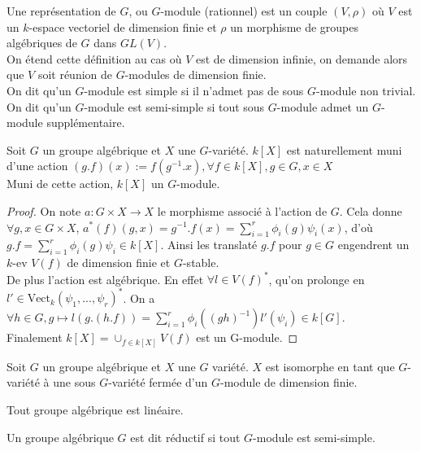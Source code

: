 \begin{defn}
Une représentation de $G$, ou $G$-module (rationnel) est un couple $(V, \rho)$ où $V$ est un $k$-espace vectoriel de dimension finie et $\rho$ un morphisme de groupes algébriques de $G$ dans $GL(V)$.\\
On étend cette définition au cas où $V$ est de dimension infinie, on demande alors que $V$ soit réunion de $G$-modules de dimension finie.\\
On dit qu'un $G$-module est simple si il n'admet pas de sous $G$-module non trivial. On dit qu'un $G$-module est semi-simple si tout sous $G$-module admet un $G$-module supplémentaire.
\end{defn}

\begin{prop}\label{GmoduleSectionsGlobales}
Soit $G$ un groupe algébrique et $X$ une $G$-variété. $k[X]$ est naturellement muni d'une action $(g.f)(x):=f(g^{-1}.x), \forall f\in k[X], g\in G,x\in X$\\
Muni de cette action, $k[X]$ un $G$-module.
\end{prop}
\begin{proof}
On note $a:G\times X\rightarrow X$ le morphisme associé à l'action de $G$. Cela donne $\forall g,x \in G\times X$, $a^*(f)(g,x)=g^{-1}.f(x)=\sum_{i=1}^r\phi_i(g)\psi_i(x)$, d'où $g.f=\sum_{i=1}^r\phi_i(g)\psi_i\in k[X]$. Ainsi les translaté $g.f$ pour $g\in G$ engendrent un $k$-ev $V(f)$ de dimension finie et $G$-stable. \\
De plus l'action est algébrique. En effet $\forall l\in V(f)^*$, qu'on prolonge en $l'\in \textrm{Vect}_k(\psi_1,...,\psi_r)^*$. On a $\forall h\in G, g\mapsto l(g.(h.f))=\sum_{i=1}^r\phi_i((gh)^{-1})l'(\psi_i)\in k[G]$.\\
Finalement $k[X]=\cup_{f\in k[X]}V(f)$ est un G-module.
\end{proof}

\begin{thm}\label{embed}
Soit $G$ un groupe algébrique et $X$ une $G$ variété. $X$ est isomorphe en tant que $G$-variété à une sous $G$-variété fermée d'un $G$-module de dimension finie.
\end{thm}

\begin{cor}
Tout groupe algébrique est linéaire.
\end{cor}

\begin{defn}
Un groupe algébrique $G$ est dit réductif si tout $G$-module est semi-simple.
\end{defn}

